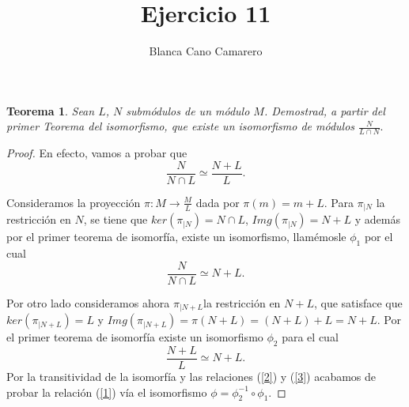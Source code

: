 \documentclass{article}
\title{Ejercicio 11}
\author{Blanca Cano Camarero}
\newtheorem*{teorema*}{Teorema}
\begin{document}
\maketitle

\begin{teorema*}
    Sean $L$, $N$ submódulos de un módulo $M$. Demostrad, a partir del primer Teorema del isomorfismo, que existe un isomorfismo de módulos $\frac{N}{L \cap N}.$
\end{teorema*}   

\begin{proof}
   En efecto, vamos a probar que 
   \begin{equation}\label{1}
       \frac{N}{N \cap L} \simeq \frac{N + L}{L}.
   \end{equation}

   Consideramos la proyección $\pi : M \longrightarrow \frac{M}{L}$ dada por $\pi(m)= m+L.$
   Para $\pi_{|N}$ la restricción en $N$, se tiene que 
   $ker(\pi_{|N}) = N \cap L$, $Img(\pi_{|N})= N+L$ y además por 
   el primer teorema de isomorfía, existe un isomorfismo, llamémosle $\phi_1$ por el cual 
   \begin{equation}\label{2}
       \frac{N}{N \cap L} 
       \simeq
       N+L.
   \end{equation}

   Por otro lado consideramos ahora  $\pi_{|N+L}$la restricción en $N+L$, que satisface que 
   $ker(\pi_{|N+L}) = L$ y 
   $Img(\pi_{|N+L})=\pi(N+L) = (N+L)+L = N+L$. Por el primer teorema de isomorfía existe un isomorfismo $\phi_2$ para el cual 
   \begin{equation}\label{3}
       \frac{N+L}{L} \simeq N+L.
   \end{equation}
    Por la transitividad de la isomorfía y las relaciones (\ref{2}) y (\ref{3}) acabamos de probar la relación (\ref{1}) vía el isomorfismo $\phi = \phi_2^{-1} \circ \phi_1$.


\end{proof}
\end{document}
